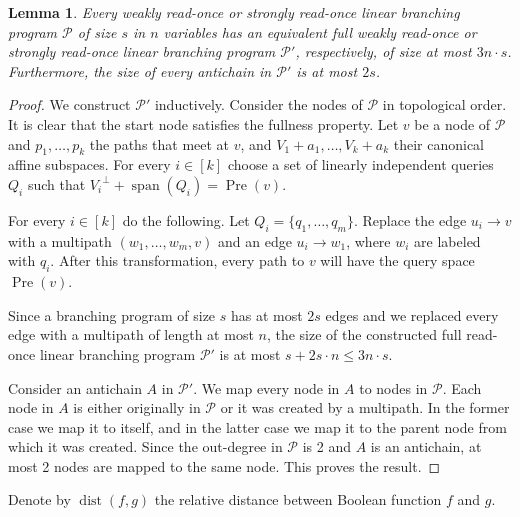 \documentclass[a4paper,11pt,draft]{article}
\newtheorem{lemma}[theorem]{Lemma}
\theoremstyle{definition}
\theoremstyle{remark}
\DeclareMathOperator{\dist}{dist}
\DeclareMathOperator{\Span}{span}
\DeclareMathOperator{\pre}{Pre}
\newcommand{\orth}[1]{{#1}^{\perp}}
\newcommand{\calP}{\mathcal{P}}
\newcommand{\sreadonce}{strongly read-once}
\newcommand{\wreadonce}{weakly read-once}
\newcommand{\readonce}{read-once}
\begin{document}
\begin{lemma}\label{lem:full_bp}
  Every \wreadonce{} or \sreadonce{} linear branching program $\calP$ of size $s$ in $n$ variables has an equivalent full \wreadonce{} or \sreadonce{} linear branching program $\calP'$, respectively, of size at most $3n \cdot s$. Furthermore, the size of every antichain in $\calP'$ is at most $2s$.
\end{lemma}
\begin{proof}
  We construct $\calP'$ inductively. Consider the nodes of $\calP$ in topological order. It is clear that the start node satisfies the fullness property. Let $v$ be a node of $\calP$ and $p_1, \ldots, p_k$ the paths that meet at $v$, and $V_1 + a_1, \ldots, V_k + a_k$ their canonical affine subspaces. %
  For every $i \in [k]$ choose a set of linearly independent queries $Q_i$ such that $\orth{V_i} + \Span(Q_i) = \pre(v)$.

  For every $i \in [k]$ do the following. Let $Q_i = \{q_1, \ldots, q_m\}$. Replace the edge $u_i \to v$ with a multipath $(w_1, \ldots, w_m, v)$ and an edge $u_i \to w_1$, where $w_i$ are labeled with $q_i$. After this transformation, every path to $v$ will have the query space $\pre(v)$.

  Since a branching program of size $s$ has at most $2s$ edges and we replaced every edge with a multipath of length at most $n$, the size of the constructed full \readonce{} linear branching program $\calP'$ is at most $s+2s \cdot n \le 3n \cdot s$.

  Consider an antichain $A$ in $\calP'$. We map every node in $A$ to nodes in $\calP$. Each node in $A$ is either originally in $\calP$ or it was created by a multipath. In the former case we map it to itself, and in the latter case we map it to the parent node from which it was created. Since the out-degree in $\calP$ is 2 and $A$ is an antichain, at most 2 nodes are mapped to the same node. This proves the result.
\end{proof}

Denote by $\dist(f,g)$ the relative distance between Boolean function $f$ and $g$.
\end{document}

